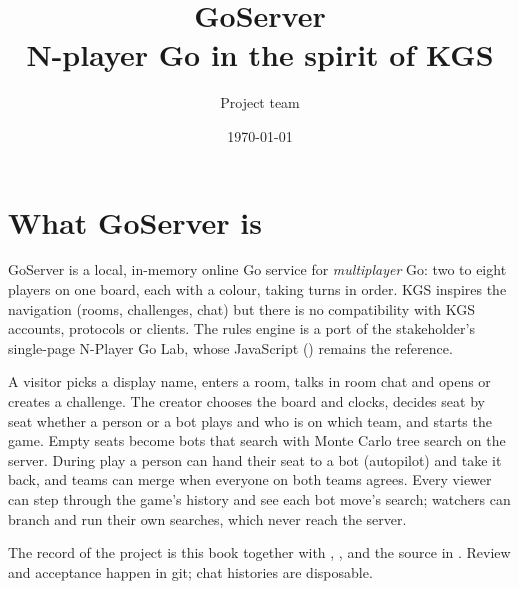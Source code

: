 \documentclass[11pt,oneside]{book}
\title{GoServer\\[0.5em]\large N-player Go in the spirit of KGS}
\author{Project team}
\date{\today}
\begin{document}
\frontmatter
\maketitle
\tableofcontents
\mainmatter

\chapter{What GoServer is}
GoServer is a local, in-memory online Go service for \emph{multiplayer} Go:
two to eight players on one board, each with a colour, taking turns in order.
KGS inspires the navigation (rooms, challenges, chat) but there is no
compatibility with KGS accounts, protocols or clients. The rules engine is a
port of the stakeholder's single-page N-Player Go Lab, whose JavaScript
() remains the reference.

A visitor picks a display name, enters a room, talks in room chat and opens or
creates a challenge. The creator chooses the board and clocks, decides seat by
seat whether a person or a bot plays and who is on which team, and starts the
game. Empty seats become bots that search with Monte Carlo tree search on the
server. During play a person can hand their seat to a bot (autopilot) and take
it back, and teams can merge when everyone on both teams agrees. Every viewer
can step through the game's history and see each bot move's search; watchers
can branch and run their own searches, which never reach the server.

The record of the project is this book together with
, ,
 and the source in . Review and
acceptance happen in git; chat histories are disposable.
\end{document}
